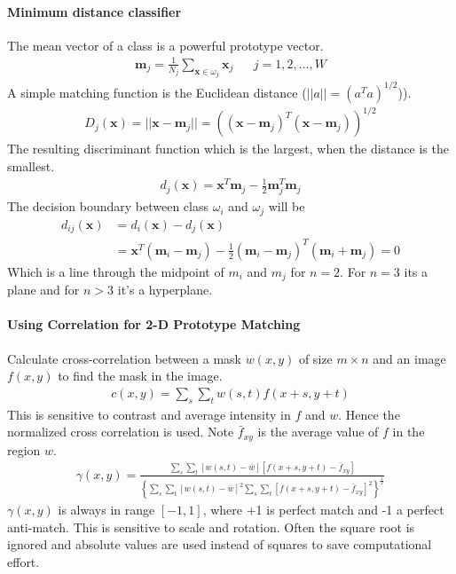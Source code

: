 \paragraph{Minimum distance classifier}
The mean vector of a class is a powerful prototype vector.
\begin{align*}
	\mathbf{m}_j = \frac{1}{N_j} \sum_{\mathbf{x} \in \omega_j}\mathbf{x}_j && j = 1,2,\dots, W
\end{align*}
A simple matching function is the Euclidean distance ($||a|| = (a^Ta)^{1/2}$)).
\begin{align*}
	D_j(\mathbf{x}) = ||\mathbf{x}-\mathbf{m}_j|| = \left((\mathbf{x}-\mathbf{m}_j)^T(\mathbf{x}-\mathbf{m}_j)\right)^{1/2}
\end{align*}
The resulting discriminant function which is the largest, when the distance is
the smallest.
\begin{align*}
	d_j(\mathbf{x}) = \mathbf{x}^T \mathbf{m}_j - \frac{1}{2}\mathbf{m}_j^T \mathbf{m}_j
\end{align*}
The decision boundary between class $\omega_i$ and $\omega_j$ will be
\begin{align*}
	d_{ij}(\mathbf{x}) &= d_i(\mathbf{x}) - d_j(\mathbf{x})\\
	&= \mathbf{x}^T(\mathbf{m}_i-\mathbf{m}_j) - \frac{1}{2}(\mathbf{m}_i-\mathbf{m}_j)^T(\mathbf{m}_i+\mathbf{m}_j) = 0
\end{align*}
Which is a line through the midpoint of $m_i$ and $m_j$ for $n=2$.
For $n=3$ its a plane and for $n>3$ it's a hyperplane.

\paragraph{Using Correlation for 2-D Prototype Matching}
Calculate cross-correlation between a mask $w(x,y)$ of size $m\times n$ and an image
$f(x,y)$ to find the mask in the image.
\begin{align*}
	c(x,y) = \sum_s\sum_tw(s,t)f(x+s,y+t)
\end{align*}
This is sensitive to contrast and average intensity in $f$ and $w$.
Hence the normalized cross correlation is used.
Note $\bar{f}_{xy}$ is the average value of $f$ in the region $w$.
\begin{align*}
	\gamma(x,y) = \frac{\sum_s\sum_t\left[w(s,t)-\bar{w}\right]\left[f(x+s,y+t)-\bar f_{xy}\right]}
	{
	\left\lbrace
		\sum_s\sum_t\left[w(s,t)-\bar w\right]^2
		\sum_s\sum_t\left[f(x+s,y+t)-\bar f_{xy}\right]^2
	\right\rbrace^{\frac{1}{2}}
	}
\end{align*}
$\gamma(x,y)$ is always in range $[-1, 1]$, where +1 is perfect match and -1 a perfect anti-match.
This is sensitive to scale and rotation.
Often the square root is ignored and absolute values are used instead of squares to save computational effort.

